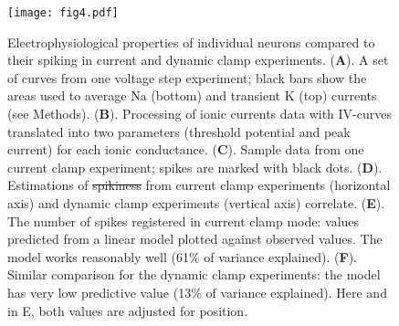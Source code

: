 \documentclass{article}
\providecommand{\DIFaddtex}[1]{{\protect\color{blue}{#1}}} %
\providecommand{\DIFdeltex}[1]{{\protect\color{red}\sout{#1}}}                      %
\providecommand{\DIFaddFL}[1]{\DIFadd{#1}} %
\providecommand{\DIFdelFL}[1]{\DIFdel{#1}} %
\providecommand{\DIFaddbeginFL}{} %
\providecommand{\DIFaddendFL}{} %
\providecommand{\DIFdelbeginFL}{} %
\providecommand{\DIFdelendFL}{} %
\providecommand{\DIFadd}[1]{\texorpdfstring{\DIFaddtex{#1}}{#1}} %
\providecommand{\DIFdel}[1]{\texorpdfstring{\DIFdeltex{#1}}{}} %
\newcommand{\DIFscaledelfig}{0.5}
\newlength{\DIFdelgraphicswidth} %
\newlength{\DIFdelgraphicsheight} %
\newcommand{\DIFaddincludegraphics}[2][]{{\color{blue}\fbox{\DIFOincludegraphics[#1]{#2}}}} %
\newcommand{\DIFdelincludegraphics}[2][]{%
\sbox{\DIFdelgraphicsbox}{\DIFOincludegraphics[#1]{#2}}%
\settoboxwidth{\DIFdelgraphicswidth}{\DIFdelgraphicsbox} %
\settoboxtotalheight{\DIFdelgraphicsheight}{\DIFdelgraphicsbox} %
\scalebox{\DIFscaledelfig}{%
\parbox[b]{\DIFdelgraphicswidth}{\usebox{\DIFdelgraphicsbox}\\[-\baselineskip] \rule{\DIFdelgraphicswidth}{0em}}\llap{\resizebox{\DIFdelgraphicswidth}{\DIFdelgraphicsheight}{%
\setlength{\unitlength}{\DIFdelgraphicswidth}%
\begin{picture}(1,1)%
\thicklines\linethickness{2pt} %
{\color[rgb]{1,0,0}\put(0,0){\framebox(1,1){}}}%
{\color[rgb]{1,0,0}\put(0,0){\line( 1,1){1}}}%
{\color[rgb]{1,0,0}\put(0,1){\line(1,-1){1}}}%
\end{picture}%
}\hspace*{3pt}}} %
} %
\DeclareRobustCommand{\DIFaddbeginFL}{\DIFOaddbeginFL \let\includegraphics\DIFaddincludegraphics} %
\DeclareRobustCommand{\DIFaddendFL}{\DIFOaddendFL \let\includegraphics\DIFOincludegraphics} %
\DeclareRobustCommand{\DIFdelbeginFL}{\DIFOdelbeginFL \let\includegraphics\DIFdelincludegraphics} %
\DeclareRobustCommand{\DIFdelendFL}{\DIFOaddendFL \let\includegraphics\DIFOincludegraphics} %
\begin{document}
\begin{figure}[!t]
\centering
\texttt{[image: fig4.pdf]}
\caption{Electrophysiological properties of individual neurons compared to their spiking in current and dynamic clamp experiments. (\textbf{A}). A set of curves from one voltage step experiment; black bars show the areas used to average Na (bottom) and transient K (top) currents (see Methods). (\textbf{B}). Processing of ionic currents data with IV-curves translated into two parameters (threshold potential and peak current) for each ionic conductance. (\textbf{C}). Sample data from one current clamp experiment; spikes are marked with black dots. (\textbf{D}). Estimations of \DIFdelbeginFL \DIFdelFL{spikiness }\DIFdelendFL \DIFaddbeginFL \DIFaddFL{excitability }\DIFaddendFL from current clamp experiments (horizontal axis) and dynamic clamp experiments (vertical axis) correlate. (\textbf{E}). The number of spikes registered in current clamp mode: values predicted from a linear model plotted against observed values. The model works reasonably well (61\% of variance explained). (\textbf{F}). Similar comparison for the dynamic clamp experiments: the model has very low predictive value (13\% of variance explained). Here and in E, both values are adjusted for position.}
\end{figure}
\end{document}
